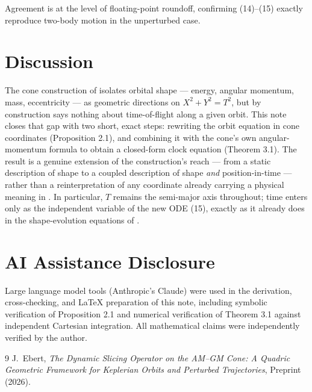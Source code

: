 \documentclass[12pt]{amsart}
\theoremstyle{plain}
\theoremstyle{remark}
\begin{document}
Agreement is at the level of floating-point roundoff, confirming (14)--(15) exactly reproduce two-body motion in the unperturbed case.

\section{Discussion}

The cone construction of \cite{Ebert2026Cone} isolates orbital shape --- energy, angular momentum, mass, eccentricity --- as geometric directions on $X^2+Y^2=T^2$, but by construction says nothing about time-of-flight along a given orbit. This note closes that gap with two short, exact steps: rewriting the orbit equation in cone coordinates (Proposition 2.1), and combining it with the cone's own angular-momentum formula to obtain a closed-form clock equation (Theorem 3.1). The result is a genuine extension of the construction's reach --- from a static description of shape to a coupled description of shape \emph{and} position-in-time --- rather than a reinterpretation of any coordinate already carrying a physical meaning in \cite{Ebert2026Cone}. In particular, $T$ remains the semi-major axis throughout; time enters only as the independent variable of the new ODE (15), exactly as it already does in the shape-evolution equations of \cite{Ebert2026Cone}.

\section*{AI Assistance Disclosure}

Large language model tools (Anthropic's Claude) were used in the derivation, cross-checking, and LaTeX preparation of this note, including symbolic verification of Proposition 2.1 and numerical verification of Theorem 3.1 against independent Cartesian integration. All mathematical claims were independently verified by the author.

\begin{thebibliography}{9}
 J.~Ebert, \emph{The Dynamic Slicing Operator on the AM--GM Cone: A Quadric Geometric Framework for Keplerian Orbits and Perturbed Trajectories}, Preprint (2026).
\end{thebibliography}
\end{document}
